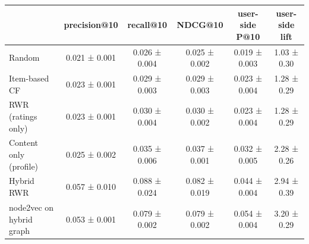 \begin{tabular}{lccccc}
\toprule
 & precision@10 & recall@10 & NDCG@10 & user-side P@10 & user-side lift \\
\midrule
Random & 0.021 ± 0.001 & 0.026 ± 0.004 & 0.025 ± 0.002 & 0.019 ± 0.003 & 1.03 ± 0.30 \\
Item-based CF & 0.023 ± 0.001 & 0.029 ± 0.003 & 0.029 ± 0.003 & 0.023 ± 0.004 & 1.28 ± 0.29 \\
RWR (ratings only) & 0.023 ± 0.001 & 0.030 ± 0.004 & 0.030 ± 0.002 & 0.023 ± 0.004 & 1.28 ± 0.29 \\
Content only (profile) & 0.025 ± 0.002 & 0.035 ± 0.006 & 0.037 ± 0.001 & 0.032 ± 0.005 & 2.28 ± 0.26 \\
Hybrid RWR & 0.057 ± 0.010 & 0.088 ± 0.024 & 0.082 ± 0.019 & 0.044 ± 0.004 & 2.94 ± 0.39 \\
node2vec on hybrid graph & 0.053 ± 0.001 & 0.079 ± 0.002 & 0.079 ± 0.002 & 0.054 ± 0.004 & 3.20 ± 0.29 \\
\bottomrule
\end{tabular}
